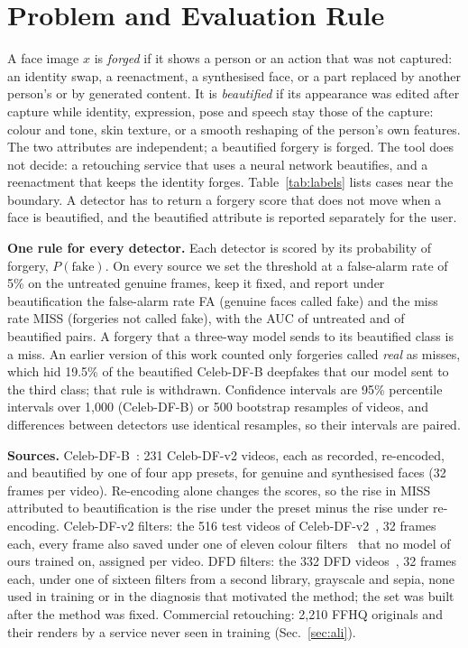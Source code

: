 
\section{Problem and Evaluation Rule}
\label{sec:protocol}
A face image $x$ is \emph{forged} if it shows a person or an action that was not captured: an identity swap, a reenactment,
a synthesised face, or a part replaced by another person's or by generated content. It is \emph{beautified} if its
appearance was edited after capture while identity, expression, pose and speech stay those of the capture: colour and tone,
skin texture, or a smooth reshaping of the person's own features. The two attributes are independent; a beautified forgery
is forged. The tool does not decide: a retouching service that uses a neural network beautifies, and a reenactment that
keeps the identity forges. Table~\ref{tab:labels} lists cases near the boundary. A detector has to return a forgery score
that does not move when a face is beautified, and the beautified attribute is reported separately for the user.

\textbf{One rule for every detector.} Each detector is scored by its probability of forgery, $P(\text{fake})$. On every
source we set the threshold at a false-alarm rate of 5\% on the untreated genuine frames, keep it fixed, and report under
beautification the false-alarm rate FA (genuine faces called fake) and the miss rate MISS (forgeries not called fake), with
the AUC of untreated and of beautified pairs. A forgery that a three-way model sends to its beautified class is a miss. An
earlier version of this work counted only forgeries called \emph{real} as misses, which hid 19.5\% of the beautified
Celeb-DF-B deepfakes that our model sent to the third class; that rule is withdrawn. Confidence intervals are 95\%
percentile intervals over 1,000 (Celeb-DF-B) or 500 bootstrap resamples of videos, and differences between detectors use
identical resamples, so their intervals are paired.

\textbf{Sources.} Celeb-DF-B~\cite{libourel2024}: 231 Celeb-DF-v2 videos, each as recorded, re-encoded, and beautified by
one of four app presets, for genuine and synthesised faces (32 frames per video). Re-encoding alone changes the scores, so
the rise in MISS attributed to beautification is the rise under the preset minus the rise under re-encoding. Celeb-DF-v2
filters: the 516 test videos of Celeb-DF-v2~\cite{celebdf}, 32 frames each, every frame also saved under one of eleven
colour filters~\cite{pilgram} that no model of ours trained on, assigned per video. DFD filters: the 332 DFD
videos~\cite{dfd}, 32 frames each, under one of sixteen filters from a second library, grayscale and sepia, none used in
training or in the diagnosis that motivated the method; the set was built after the method was fixed. Commercial
retouching: 2,210 FFHQ originals and their renders by a service never seen in training (Sec.~\ref{sec:ali}).

